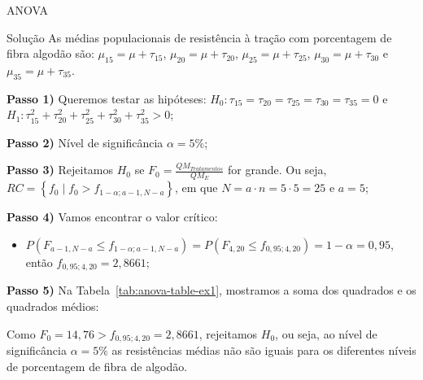 \documentclass[8pt]{beamer}
\begin{document}
\begin{frame}{ANOVA}

\footnotesize
\begin{block}{Solução}
	As médias populacionais de resistência à tração com porcentagem de fibra algodão são: $\mu_{15} = \mu + \tau_{15}$, $\mu_{20} = \mu + \tau_{20}$, $\mu_{25} = \mu + \tau_{25}$, $\mu_{30} = \mu + \tau_{30}$ e $\mu_{35} = \mu + \tau_{35}$.
	
	\textbf{Passo 1)} Queremos testar as hipóteses: $H_0: \tau_{15} = \tau_{20} = \tau_{25} = \tau_{30} = \tau_{35} = 0$ e $H_1: \tau_{15}^2 + \tau_{20}^2 + \tau_{25}^2 + \tau_{30}^2 + \tau_{35}^2 > 0$;
	
	\textbf{Passo 2)} Nível de significância $\alpha=5\%$;
	
	\textbf{Passo 3)} Rejeitamos $H_0$ se $F_0 = \frac{QM_{Tratamentos}}{QM_E}$ for grande. Ou seja, $RC = \left\{ f_0 \mid f_0 > f_{1-\alpha; a-1, N-a} \right\}$, em que $N=a \cdot n = 5 \cdot 5 = 25$ e $a = 5$;
	
	\textbf{Passo 4)} Vamos encontrar o valor crítico:
	\begin{itemize}
		\item $P(F_{a-1, N-a} \leq f_{1-\alpha; a-1, N-a}) = P(F_{4, 20} \leq f_{0,95; 4, 20}) = 1-\alpha=0,95$, então $f_{0,95; 4, 20} = 2,8661$;
	\end{itemize}

	\textbf{Passo 5)} Na Tabela~\ref{tab:anova-table-ex1}, mostramos a soma dos quadrados e os quadrados médios:
	\begin{table}[ht]
		\centering
		\caption{\scriptsize Tabela ANOVA.} 
		\label{tab:anova-table-ex1}
	\end{table}
	Como $F_0 = 14,76 > f_{0,95; 4, 20} = 2,8661$, rejeitamos $H_0$, ou seja, ao nível de significância $\alpha=5\%$ as resistências médias não são iguais para os diferentes níveis de porcentagem de fibra de algodão.
	
\end{block}
\normalsize

\end{frame}
\end{document}

